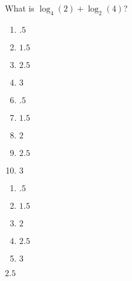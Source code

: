 


 What is $\log_{4}(2)+\log_{2}(4)$?


\ifsat
	\begin{enumerate}[label=\Alph*)]
		\item   $.5$
		\item   $1.5$
		\item  $2.5$%
		\item    $3$
	\end{enumerate}
\else
\fi

\ifacteven
	\begin{enumerate}[label=\textbf{\Alph*.},itemsep=\fill,align=left]
		\setcounter{enumii}{5}
		\item   $.5$
		\item   $1.5$
		\item  $2$
		\addtocounter{enumii}{1}
		\item  $2.5$%
		\item    $3$
	\end{enumerate}
\else
\fi

\ifactodd
	\begin{enumerate}[label=\textbf{\Alph*.},itemsep=\fill,align=left]
		\item   $.5$
		\item   $1.5$
		\item  $2$
		\item  $2.5$%
		\item    $3$
	\end{enumerate}
\else
\fi

\ifgridin
  $2.5$%
		
\else
\fi

